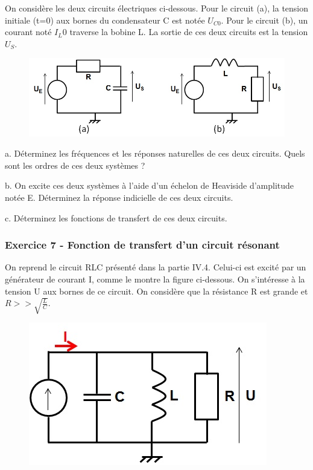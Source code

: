 	On considère les deux circuits électriques ci-dessous. Pour le circuit (a), la tension initiale (t=0) aux bornes du condensateur C est notée $U_{C0}$. Pour le circuit (b), un courant noté $I_L0$ traverse la bobine L. La sortie de ces deux circuits est la tension $U_{S}$.
	
	\begin{figure}[h!]
		\centering
		\includegraphics[scale=0.5]{images/Exo_2_4.jpg} 
	\end{figure} 
	
	a. Déterminez les fréquences et les réponses naturelles de ces deux circuits. Quels sont les ordres de ces deux systèmes ? 
	
	b. On excite ces deux systèmes à l'aide d'un échelon de Heaviside d'amplitude notée E. Déterminez la réponse indicielle de ces deux circuits. 
	
	c. Déterminez les fonctions de transfert de ces deux circuits.
	
	\vspace{1\baselineskip}
	
	\subsubsection{Exercice 7 - Fonction de transfert d'un circuit résonant}
	
	On reprend le circuit RLC présenté dans la partie IV.4. Celui-ci est excité par un générateur de courant I, comme le montre la figure ci-dessous. On s'intéresse à la tension U aux bornes de ce circuit. On considère que la résistance R est grande et $R>>\sqrt{\frac{L}{C}}$.
 	 	
 	\begin{figure}[h!]
 		\centering
 		\includegraphics[scale=0.5]{images/Exo_2_5.jpg} 
 	\end{figure} 
 

